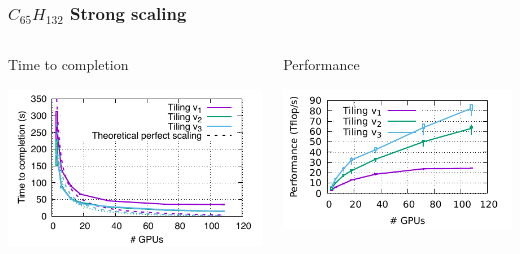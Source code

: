 \begin{frame}
  \frametitle{$C_{65}H_{132}$ Strong scaling}

  \begin{columns}
    \begin{column}{.45\linewidth}
      \begin{center}
        Time to completion
        
        \includegraphics[width=\linewidth]{c65h132-time.pdf}
      \end{center}
    \end{column}
    \begin{column}{.45\linewidth}
      \begin{center}
        Performance
          
          \includegraphics[width=\linewidth]{c65h132-perf.pdf}
      \end{center}
    \end{column}
  \end{columns}
\end{frame}

